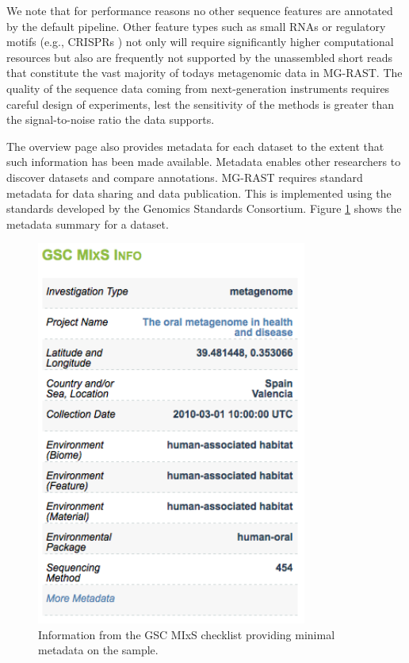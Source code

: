 \documentclass[12pt,fullpage]{report}
\begin{document}
We note that for performance reasons no other sequence features are annotated by the default pipeline. Other feature types such as small RNAs or regulatory motifs (e.g., CRISPRs \cite{CRISPRS}) not only will require significantly higher computational resources but also are frequently not supported by the unassembled short reads that constitute the vast majority of todays metagenomic data in MG-RAST. The quality of the sequence data coming from next-generation instruments requires careful design of experiments, lest the sensitivity of the methods is greater than the signal-to-noise ratio the data supports.

The overview page also provides metadata for each dataset to the extent that such information has been made available. Metadata enables other researchers to discover datasets and compare annotations. MG-RAST requires standard metadata for data sharing and data publication. This is implemented using the standards developed by the Genomics Standards Consortium. Figure \ref{fig:GSC-MIxS-checklist-information} shows the metadata summary for a dataset.

\begin{figure}
\begin{center}
\includegraphics[width=3.5in]{Images/GSC-MIxS-checklist-information.png}
\end{center}
\caption{
Information from the GSC MIxS checklist providing minimal metadata on the sample.
}
\label{fig:GSC-MIxS-checklist-information}
\end{figure}
\end{document}
